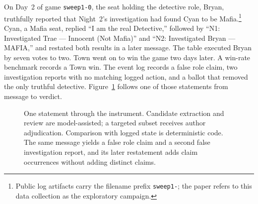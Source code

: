 \documentclass[11pt]{article}
\newcommand{\code}[1]{\texttt{#1}}
\begin{document}
On Day~2 of game \code{sweep1-0}, the seat holding the detective role, Bryan, truthfully reported that Night~2's investigation had found Cyan to be Mafia.\footnote{Public log artifacts carry the filename prefix \code{sweep1-}; the paper refers to this data collection as the exploratory campaign.} Cyan, a Mafia seat, replied ``I am the real Detective,'' followed by ``N1: Investigated Trae --- Innocent (Not Mafia)'' and ``N2: Investigated Bryan --- MAFIA,'' and restated both results in a later message. The table executed Bryan by seven votes to two. Town went on to win the game two days later. A win-rate benchmark records a Town win. The event log records a false role claim, two investigation reports with no matching logged action, and a ballot that removed the only truthful detective. Figure~\ref{fig:flow} follows one of those statements from message to verdict.

\begin{figure}[t]
\centering
{}
\caption{One statement through the instrument. Candidate extraction and review are model-assisted; a targeted subset receives author adjudication. Comparison with logged state is deterministic code. The same message yields a false role claim and a second false investigation report, and its later restatement adds claim occurrences without adding distinct claims.}
\label{fig:flow}
\end{figure}
\end{document}
